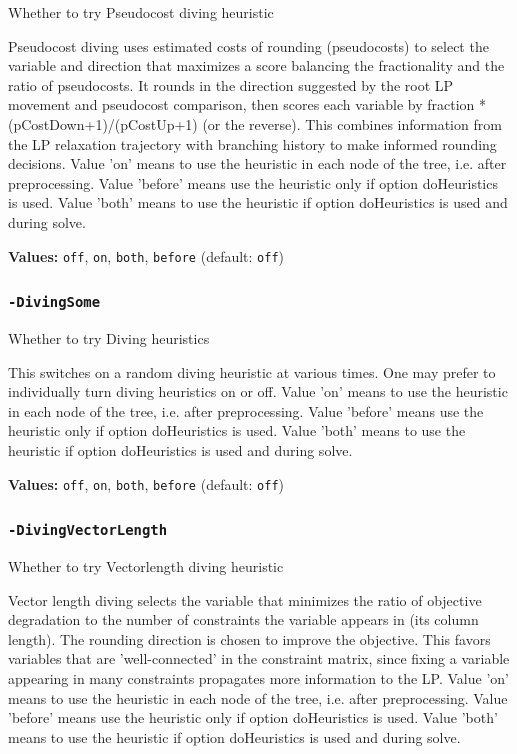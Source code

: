 \documentclass[11pt,a4paper]{article}
\begin{document}
Whether to try Pseudocost diving heuristic

Pseudocost diving uses estimated costs of rounding (pseudocosts) to select the variable and direction that maximizes a score balancing the fractionality and the ratio of pseudocosts. It rounds in the direction suggested by the root LP movement and pseudocost comparison, then scores each variable by fraction * (pCostDown+1)/(pCostUp+1) (or the reverse). This combines information from the LP relaxation trajectory with branching history to make informed rounding decisions. Value 'on' means to use the heuristic in each node of the tree, i.e. after preprocessing. Value 'before' means use the heuristic only if option doHeuristics is used. Value 'both' means to use the heuristic if option doHeuristics is used and during solve.

\textbf{Values:} \texttt{off}, \texttt{on}, \texttt{both}, \texttt{before} (default: \texttt{off})

\subsubsection*{\texttt{-DivingSome}}

Whether to try Diving heuristics

This switches on a random diving heuristic at various times. One may prefer to individually turn diving heuristics on or off. Value 'on' means to use the heuristic in each node of the tree, i.e. after preprocessing. Value 'before' means use the heuristic only if option doHeuristics is used. Value 'both' means to use the heuristic if option doHeuristics is used and during solve.

\textbf{Values:} \texttt{off}, \texttt{on}, \texttt{both}, \texttt{before} (default: \texttt{off})

\subsubsection*{\texttt{-DivingVectorLength}}

Whether to try Vectorlength diving heuristic

Vector length diving selects the variable that minimizes the ratio of objective degradation to the number of constraints the variable appears in (its column length). The rounding direction is chosen to improve the objective. This favors variables that are 'well-connected' in the constraint matrix, since fixing a variable appearing in many constraints propagates more information to the LP. Value 'on' means to use the heuristic in each node of the tree, i.e. after preprocessing. Value 'before' means use the heuristic only if option doHeuristics is used. Value 'both' means to use the heuristic if option doHeuristics is used and during solve.
\end{document}
